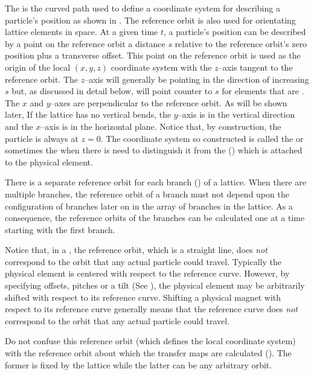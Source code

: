 The  is the curved path used to define a coordinate system for describing
a particle's position as shown in . The reference orbit is also used for
orientating lattice elements in space. At a given time $t$, a particle's position can be described
by a point on the reference orbit a distance $s$ relative to the reference orbit's zero position
plus a transverse offset. This point on the reference orbit is used as the origin of the local $(x,
y, z)$ coordinate system with the $z$--axis tangent to the reference orbit. The $z$--axis will
generally be pointing in the direction of increasing $s$ but, as discussed in detail below, will
point counter to $s$ for elements that are . The $x$ and $y$--axes are perpendicular to
the reference orbit. As will be shown later, If the lattice has no vertical bends, the $y$--axis is
in the vertical direction and the $x$--axis is in the horizontal plane. Notice that, by
construction, the particle is always at $z = 0$. The coordinate system so constructed is called the
 or sometimes the  when there
is need to distinguish it from the  () which is
attached to the physical element.

There is a separate reference orbit for each branch () of a lattice. When there
are multiple branches, the reference orbit of a branch must not depend upon the configuration of
branches later on in the array of branches in the lattice. As a consequence, the reference orbits of
the branches can be calculated one at a time starting with the first branch.

Notice that, in a , the reference orbit, which is a straight line, does {\em not}
correspond to the orbit that any actual particle could travel. Typically the physical element is
centered with respect to the reference curve. However, by specifying offsets, pitches or a tilt (See
), the physical element may be arbitrarily shifted with respect to its reference
curve. Shifting a physical magnet with respect to its reference curve generally means that the
reference curve does {\em not} correspond to the orbit that any actual particle could travel.

Do not confuse this reference orbit (which defines the local coordinate system) with the reference
orbit about which the transfer maps are calculated (). The former is fixed by the
lattice while the latter can be any arbitrary orbit.

